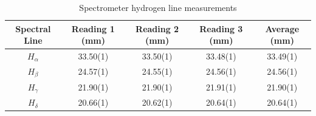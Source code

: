 \documentclass[12pt]{article}
\begin{document}
\begin{table}[H]
\centering
\caption{Spectrometer hydrogen line measurements}
\begin{tabular}{c|c|c|c|c}
\hline
\hline
Spectral Line & Reading 1 (mm) & Reading 2 (mm) & Reading 3 (mm) & Average (mm) \\
\hline\hline
$H_\alpha$ & 33.50(1) & 33.50(1) & 33.48(1) & 33.49(1) \\
$H_\beta$  & 24.57(1) & 24.55(1) & 24.56(1) & 24.56(1) \\
$H_\gamma$ & 21.90(1) & 21.90(1) & 21.91(1) & 21.90(1) \\
$H_\delta$ & 20.66(1) & 20.62(1) & 20.64(1) & 20.64(1) \\
\hline\hline
\end{tabular}
\label{hydrogen}
\end{table}
\end{document}
